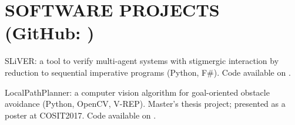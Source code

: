 \documentclass[a4paper]{deedy-resume-openfont}
\begin{document}
\begin{minipage}[t]{0.67\textwidth}
\section{SOFTWARE PROJECTS \small{(GitHub: \href{https://github.com/lou1306}{})}}
\location{\hspace{1em}}

\begin{tightemize}
\item
SLiVER\@: a tool to verify multi-agent systems with stigmergic interaction
by reduction to sequential imperative programs
(Python, F\#).
Code available on \href{https://github.com/labs-lang/sliver}{}.

\item
LocalPathPlanner: a computer vision algorithm
for goal-oriented obstacle avoidance (Python, OpenCV, V-REP).
Master's thesis project; presented as a poster at COSIT2017. 
Code available on \href{https://github.com/lou1306/localpathplanner}{}.
\end{tightemize}

\end{minipage} 
\end{document}
